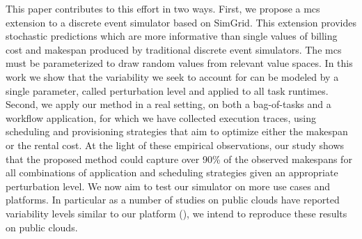 \documentclass[]{llncs}
\begin{document}
This paper contributes to this effort in two ways. First, we propose a \acl{mcs}
extension  to a  discrete  event  simulator based  on  SimGrid.  This  extension
provides stochastic predictions which are more informative than single values of
billing cost  and makespan  produced by  traditional discrete  event simulators.
The \acl{mcs}  must be parameterized to  draw random values from  relevant value
spaces. In this work we show that the  variability we seek to account for can be
modeled  by a  single parameter,  called perturbation  level and applied  to all
task
runtimes. Second, we apply our method in  a real setting, on both a bag-of-tasks
and a workflow  application, for which we have collected  execution traces, using
scheduling and provisioning strategies that  aim to optimize either the makespan
or the  rental cost.  At  the light of  these empirical observations,  our study
shows that the proposed method could capture over 90\% of the observed makespans
for  all  combinations  of  application   and  scheduling  strategies  given  an
appropriate perturbation  level.  We now aim  to test our simulator  on more use
cases and platforms.  In particular as a number of studies on public clouds have
reported variability levels similar to our platform (\cite{LeitnerC16,pics}), we
intend to reproduce these results on public clouds.



\end{document}
